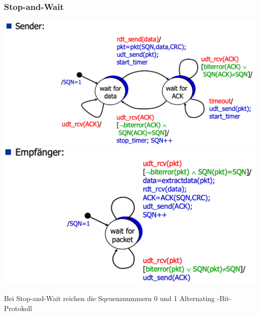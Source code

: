 \subsubsection{Stop-and-Wait}
\begin{multicols}{2}
\includegraphics[scale=0.125]{images/Stop_and_Wait_Sender.png}
\includegraphics[scale=0.125]{images/Stop_and_Wait_Empfaenger.png}
\end{multicols}
Bei Stop-and-Wait reichen die Sqeuenznummern 0 und 1 \rightarrow Alternating -Bit-Protokoll
